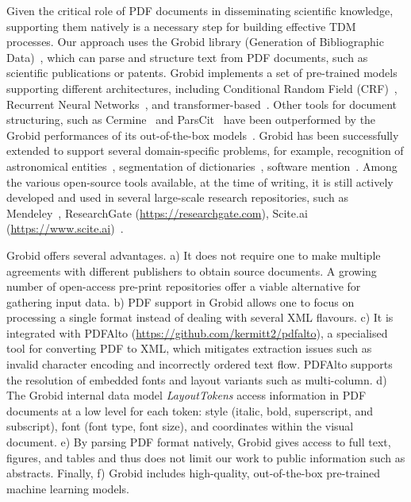Given the critical role of PDF documents in disseminating scientific knowledge, supporting them natively is a necessary step for building effective TDM processes. 
Our approach uses the Grobid library (Generation of Bibliographic Data)~\cite{Grobid}, which can parse and structure text from PDF documents, such as scientific publications or patents. 
Grobid implements a set of pre-trained models supporting different architectures, including Conditional Random Field (CRF)~\cite{lafferty2001conditional}, Recurrent Neural Networks~\cite{lample2016neural}, and transformer-based~\cite{devlin2018bert}.
Other tools for document structuring, such as Cermine~\cite{tkaczyk2015cermine} and ParsCit~\cite{councill2008parscit} have been outperformed by the Grobid performances of its out-of-the-box models~\cite{tkaczyk2018evaluation}.
Grobid has been successfully extended to support several domain-specific problems, for example, recognition of astronomical entities~\cite{grobid-astro}, segmentation of dictionaries~\cite{khemakhem2017automatic}, software mention~\cite{software-mentions}. 
Among the various open-source tools available, at the time of writing, it is still actively developed and used in several large-scale research repositories, such as Mendeley~\cite{mendeley-extraction}, ResearchGate (\url{https://researchgate.com}), Scite.ai (\url{https://www.scite.ai})~\cite{nicholson2021scite}. 

Grobid offers several advantages. 
a) It does not require one to make multiple agreements with different publishers to obtain source documents. A growing number of open-access pre-print repositories offer a viable alternative for gathering input data. 
b) PDF support in Grobid allows one to focus on processing a single format instead of dealing with several XML flavours. 
c) It is integrated with PDFAlto (\url{https://github.com/kermitt2/pdfalto}), a specialised tool for converting PDF to XML, which mitigates extraction issues such as invalid character encoding and incorrectly ordered text flow. PDFAlto supports the resolution of embedded fonts and layout variants such as multi-column. 
d) The Grobid internal data model \textit{LayoutTokens} access information in PDF documents at a low level for each token: style (italic, bold, superscript, and subscript), font (font type, font size), and coordinates within the visual document. 
e) By parsing PDF format natively, Grobid gives access to full text, figures, and tables and thus does not limit our work to public information such as abstracts.
Finally, f) Grobid includes high-quality, out-of-the-box pre-trained machine learning models.

